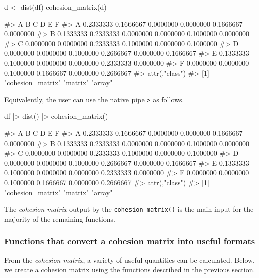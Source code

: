 \begin{Schunk}
\begin{Sinput}
d <- dist(df)
cohesion_matrix(d)
\end{Sinput}
\begin{Soutput}
#>           A         B         C         D         E         F
#> A 0.2333333 0.1666667 0.0000000 0.0000000 0.1666667 0.0000000
#> B 0.1333333 0.2333333 0.0000000 0.0000000 0.1000000 0.0000000
#> C 0.0000000 0.0000000 0.2333333 0.1000000 0.0000000 0.1000000
#> D 0.0000000 0.0000000 0.1000000 0.2666667 0.0000000 0.1666667
#> E 0.1333333 0.1000000 0.0000000 0.0000000 0.2333333 0.0000000
#> F 0.0000000 0.0000000 0.1000000 0.1666667 0.0000000 0.2666667
#> attr(,"class")
#> [1] "cohesion_matrix" "matrix"          "array"
\end{Soutput}
\end{Schunk}

Equivalently, the user can use the native pipe
\texttt{\textbar{}\textgreater{}} as follows.

\begin{Schunk}
\begin{Sinput}
df |>
  dist() |>
  cohesion_matrix()
\end{Sinput}
\begin{Soutput}
#>           A         B         C         D         E         F
#> A 0.2333333 0.1666667 0.0000000 0.0000000 0.1666667 0.0000000
#> B 0.1333333 0.2333333 0.0000000 0.0000000 0.1000000 0.0000000
#> C 0.0000000 0.0000000 0.2333333 0.1000000 0.0000000 0.1000000
#> D 0.0000000 0.0000000 0.1000000 0.2666667 0.0000000 0.1666667
#> E 0.1333333 0.1000000 0.0000000 0.0000000 0.2333333 0.0000000
#> F 0.0000000 0.0000000 0.1000000 0.1666667 0.0000000 0.2666667
#> attr(,"class")
#> [1] "cohesion_matrix" "matrix"          "array"
\end{Soutput}
\end{Schunk}

The \emph{cohesion matrix} output by the \texttt{cohesion\_matrix()} is
the main input for the majority of the remaining functions.

\hypertarget{functions-that-convert-a-cohesion-matrix-into-useful-formats}{%
\subsubsection{Functions that convert a cohesion matrix into useful
formats}\label{functions-that-convert-a-cohesion-matrix-into-useful-formats}}

From the \emph{cohesion matrix}, a variety of useful quantities can be
calculated. Below, we create a cohesion matrix using the functions
described in the previous section.

